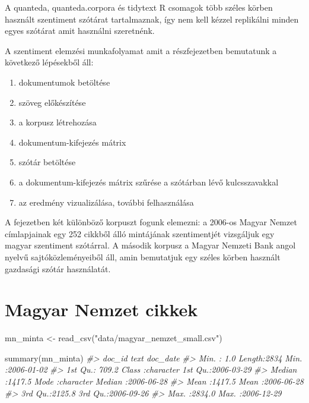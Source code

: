 \documentclass[
]{book}
\newenvironment{Shaded}{\begin{snugshade}}{\end{snugshade}}
\newcommand{\CommentTok}[1]{\textcolor[rgb]{0.56,0.35,0.01}{\textit{#1}}}
\newcommand{\FunctionTok}[1]{\textcolor[rgb]{0.00,0.00,0.00}{#1}}
\newcommand{\NormalTok}[1]{#1}
\newcommand{\OtherTok}[1]{\textcolor[rgb]{0.56,0.35,0.01}{#1}}
\newcommand{\StringTok}[1]{\textcolor[rgb]{0.31,0.60,0.02}{#1}}
\providecommand{\tightlist}{%
  \setlength{\itemsep}{0pt}\setlength{\parskip}{0pt}}
\begin{document}
A quanteda, quanteda.corpora és tidytext R csomagok több széles körben
használt szentiment szótárat tartalmaznak, így nem kell kézzel
replikálni minden egyes szótárat amit használni szeretnénk.

A szentiment elemzési munkafolyamat amit a részfejezetben bemutatunk a
következő lépésekből áll:

\begin{enumerate}
\def\labelenumi{\arabic{enumi}.}
\tightlist
\item
  dokumentumok betöltése
\item
  szöveg előkészítése
\item
  a korpusz létrehozása
\item
  dokumentum-kifejezés mátrix
\item
  szótár betöltése
\item
  a dokumentum-kifejezés mátrix szűrése a szótárban lévő kulcsszavakkal
\item
  az eredmény vizualizálása, további felhasználása
\end{enumerate}

A fejezetben két különböző korpuszt fogunk elemezni: a 2006-os Magyar
Nemzet címlapjainak egy 252 cikkből álló mintájának szentimentjét
vizsgáljuk egy magyar szentiment szótárral. A második korpusz a Magyar
Nemzeti Bank angol nyelvű sajtóközleményeiből áll, amin bemutatjuk egy
széles körben használt gazdasági szótár használatát.

\hypertarget{magyar-nemzet-cikkek}{%
\section{Magyar Nemzet cikkek}\label{magyar-nemzet-cikkek}}

\begin{Shaded}
\begin{Highlighting}[]
\NormalTok{mn\_minta }\OtherTok{\textless{}{-}} \FunctionTok{read\_csv}\NormalTok{(}\StringTok{"data/magyar\_nemzet\_small.csv"}\NormalTok{)}

\FunctionTok{summary}\NormalTok{(mn\_minta)}
\CommentTok{\#\textgreater{}      doc\_id           text              doc\_date         }
\CommentTok{\#\textgreater{}  Min.   :   1.0   Length:2834        Min.   :2006{-}01{-}02  }
\CommentTok{\#\textgreater{}  1st Qu.: 709.2   Class :character   1st Qu.:2006{-}03{-}29  }
\CommentTok{\#\textgreater{}  Median :1417.5   Mode  :character   Median :2006{-}06{-}28  }
\CommentTok{\#\textgreater{}  Mean   :1417.5                      Mean   :2006{-}06{-}28  }
\CommentTok{\#\textgreater{}  3rd Qu.:2125.8                      3rd Qu.:2006{-}09{-}26  }
\CommentTok{\#\textgreater{}  Max.   :2834.0                      Max.   :2006{-}12{-}29}
\end{Highlighting}
\end{Shaded}
\end{document}
